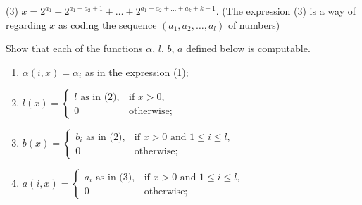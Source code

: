\documentclass[12pt,a4paper]{article}
\theoremstyle{definition}
\numberwithin{equation}{section}
\numberwithin{figure}{section}
\begin{document}
\begin{enumerate}
  (3) $x=2^{a_{1}}+2^{a_{1}+a_{2}+1}+\ldots+2^{a_{1}+a_{2}+\ldots+a_{k}+k-1}$. %
  {\color{blue}(The expression (3) is a way of regarding $x$ as coding the sequence $(a_{1},a_{2},\ldots,a_{l})$ of numbers)}

  Show that each of the functions $\alpha$, $l$, $b$, $a$ defined below is computable.
    \begin{enumerate}
    \item $\alpha(i,x)=\alpha_{i}$ as in the expression (1);
    \item $l(x)=\left\{\begin{array}{ll}
        l \mbox{ as in (2)}, & \mbox{if } x>0,\\
        0& \mbox{otherwise};
        \end{array}\right.$
    \item $b(x)=\left\{\begin{array}{ll}
        b_{i} \mbox{ as in (2)}, &\mbox{if } x>0 \mbox{ and } 1\leq i \leq l,\\
        0& \mbox{otherwise};
        \end{array}\right.$
    \item $a(i,x)=\left\{\begin{array}{ll}
        a_{i} \mbox{ as in (3)}, &\mbox{if } x>0 \mbox{ and } 1\leq i \leq l,\\
        0& \mbox{otherwise};
        \end{array}\right.$
    \end{enumerate}

\end{enumerate}


\end{document}

